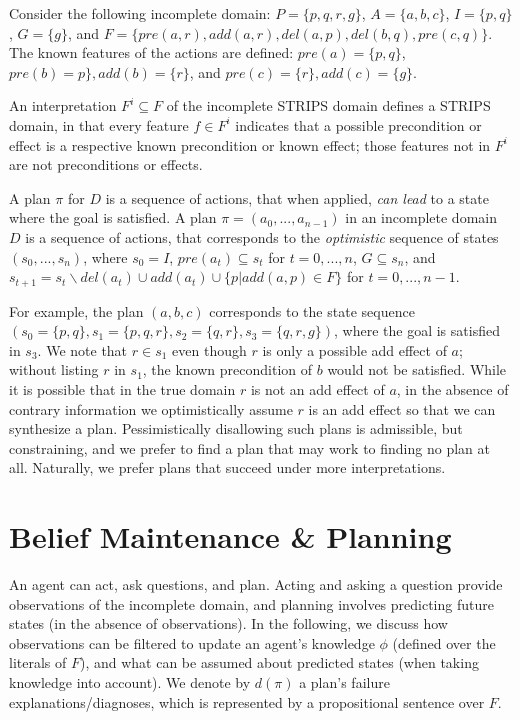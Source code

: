 \documentclass{article}
\begin{document}
Consider the following incomplete domain: $P = \{p, q, r, g\}$, ${A} =
\{{a}, {b}, {c}\}$, $I = \{p, q\}$,  $G= \{g\}$, and $F = \{pre(a, r), add(a, r),
del(a, p),del(b, q),pre(c, q) \}$.  The
known features of the actions are defined:  $pre({a}) = \{p, q\}$, $  pre({b}) =
p\},  add({b}) = \{r\}$, and  $ pre({c}) =
\{r\},  add({c}) = \{g\}$. 

An interpretation $F^i \subseteq F$ of the incomplete STRIPS domain
defines a STRIPS domain, in that every feature $f \in F^i$
indicates that a possible precondition or effect is a respective known
precondition or known effect; those features not in $F^i$ are
not preconditions or effects.   



 A plan $\pi$ for ${D}$ is a sequence of
actions, that when applied, {\em can lead} to a state where the goal is
satisfied.  A plan $\pi = ({a}_0,  ..., {a}_{n-1})$ in an incomplete
domain ${D}$ is a sequence of  actions, that corresponds to the {\em
optimistic} sequence of states $(s_0, ...,  s_n)$, where $s_0 = I$,
$pre({a}_t) \subseteq s_t$ for $t = 0,...,  n$, $G \subseteq s_n$,
and $s_{t+1} = s_t \backslash del({a}_t)  \cup
add({a}_t) \cup \{p | add(a, p) \in
F\}$ for $t = 0,...,
n-1$.

For example, the plan $({a}, {b}, {c})$ corresponds to the
state sequence $(s_0 = \{p, q\}, s_1 = \{p, q, r\}, s_2 = \{q, r\}, s_3 = \{q,
r, g\})$, where the goal is satisfied in $s_3$.  We note that $r \in s_1$ even
though $r$ is only a possible add effect of $a$; without listing $r$ in $s_1$,
the known precondition of $b$ would not be satisfied.  While it is possible that
in the true domain $r$ is not an add effect of $a$, in the absence of contrary
information we optimistically assume $r$ is an add effect so that we can
synthesize a plan.   Pessimistically disallowing such plans is admissible, but
constraining, and we prefer to find a plan that may work to finding no plan at
all.  Naturally, we prefer plans that succeed under more interpretations.

\section{Belief Maintenance \& Planning}

An agent can act, ask questions, and plan.  Acting and asking a question provide
observations of the incomplete domain, and planning involves predicting future
states (in the absence of observations).  In the following, we discuss how
observations can be filtered to update an agent's knowledge $\phi$ (defined over
the literals of $F$), and what can be assumed about predicted states
(when taking knowledge into account).  We denote by $d(\pi)$ a plan's failure
explanations/diagnoses, which is represented by a propositional sentence over
$F$.
\end{document}
